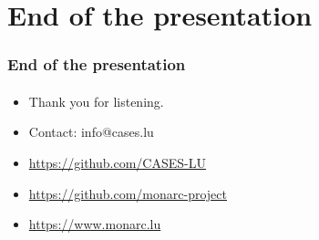 \documentclass[]{beamer}
\begin{document}
%
%
\section*{End of the presentation}
\begin{frame}
  \frametitle{End of the presentation}
  \framesubtitle{}
  \begin{center}
    \begin{itemize}
      \item Thank you for listening.
      \item Contact: info@cases.lu
      \item \url{https://github.com/CASES-LU}
      \item \url{https://github.com/monarc-project}
      \item \url{https://www.monarc.lu}
    \end{itemize}
  \end{center}
\end{frame}
\end{document}
